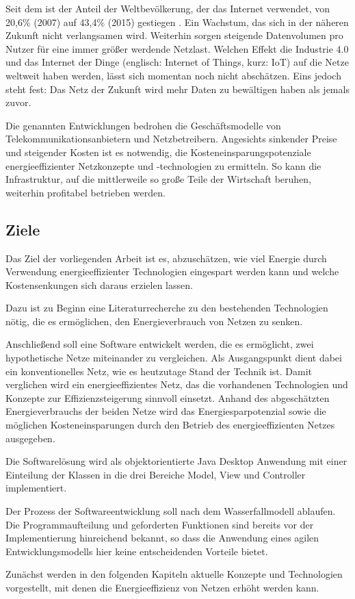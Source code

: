 Seit dem ist der Anteil der Weltbevölkerung, der das Internet verwendet, von 20,6\% (2007) auf 43,4\% (2015) gestiegen \cite{itu}. Ein Wachstum, das sich in der näheren Zukunft nicht verlangsamen wird. Weiterhin sorgen steigende Datenvolumen pro Nutzer für eine immer größer werdende Netzlast. Welchen Effekt die Industrie 4.0 und das Internet der Dinge (englisch: Internet of Things, kurz: IoT) auf die Netze weltweit haben werden, lässt sich momentan  noch nicht abschätzen. Eins jedoch steht fest: Das Netz der Zukunft wird mehr Daten zu bewältigen haben als jemals zuvor.

Die genannten Entwicklungen bedrohen die Geschäftsmodelle von Telekommunikationsanbietern und Netzbetreibern. Angesichts sinkender Preise und steigender Kosten ist es notwendig, die  Kosteneinsparungspotenziale energieeffizienter Netzkonzepte und -technologien zu ermitteln. So kann die Infrastruktur, auf die mittlerweile so große Teile der Wirtschaft beruhen, weiterhin profitabel betrieben werden.

\subsection{Ziele}
Das Ziel der vorliegenden Arbeit ist es, abzuschätzen, wie viel Energie  durch Verwendung energieeffizienter Technologien eingespart werden kann und welche Kostensenkungen sich daraus erzielen lassen.

Dazu ist zu Beginn eine Literaturrecherche zu den bestehenden Technologien nötig, die es ermöglichen, den Energieverbrauch von Netzen zu senken.

Anschließend soll eine Software entwickelt werden, die es ermöglicht, zwei hypothetische Netze miteinander zu vergleichen. Als Ausgangspunkt dient dabei ein konventionelles Netz, wie es heutzutage Stand der Technik ist. Damit verglichen wird ein energieeffizientes Netz, das die vorhandenen Technologien und Konzepte zur Effizienzsteigerung sinnvoll einsetzt. Anhand des abgeschätzten Energieverbrauchs der beiden Netze wird das Energiesparpotenzial sowie die möglichen Kosteneinsparungen durch den Betrieb des energieeffizienten Netzes ausgegeben. 

Die Softwarelösung wird als objektorientierte Java Desktop Anwendung mit einer Einteilung der Klassen in die drei Bereiche Model, View und Controller implementiert.

Der Prozess der Softwareentwicklung soll nach dem Wasserfallmodell ablaufen. Die Programmaufteilung und geforderten Funktionen sind bereits vor der Implementierung hinreichend bekannt, so dass die Anwendung eines agilen Entwicklungsmodells hier keine entscheidenden Vorteile bietet. 

Zunächst werden in den folgenden Kapiteln aktuelle Konzepte und Technologien vorgestellt, mit denen die Energieeffizienz von Netzen erhöht werden kann.
